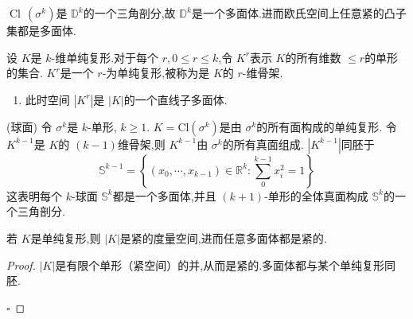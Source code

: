 \documentclass[../../几何与拓扑.tex]{subfiles}
\begin{document}
\begin{proposition}
    \(  \operatorname{Cl}\,\left(  \sigma ^{k} \right)   \)是 \(  \mathbb{D}^{k}  \)的一个三角剖分,故 \(  \mathbb{D}^{k}  \)是一个多面体.进而欧氏空间上任意紧的凸子集都是多面体.   
\end{proposition}


\begin{definition}
    设 \(  K  \)是 \(  k  \)-维单纯复形.对于每个 \(  r,  0\le r\le k  \),令 \(  K^{r}  \)表示 \(  K  \)的所有维数 \(  \le r  \)的单形的集合.       \(  K^{r}  \)是一个 \(  r  \)-为单纯复形,被称为是 \(  K  \)的 \(  r  \)-维骨架.
    
\end{definition}
\begin{remark}
    \begin{enumerate}
        \item 此时空间 \(  \left| K^{r} \right|   \)是 \(  \left| K \right|   \)的一个直线子多面体.  
    \end{enumerate}
    
\end{remark}



\begin{example}{(球面)}
    令 \(   \sigma ^{k}  \)是 \(  k  \)-单形, \(  k\ge 1  \). \(  K =  \mathrm{Cl}\left(  \sigma ^{k} \right)   \)是由 \(   \sigma ^{k}  \)的所有面构成的单纯复形.
    令 \(  K^{k-1}  \)是 \(  K  \)的 \(  \left( k-1 \right)   \)维骨架,则 \(  K^{k-1}  \)由 \(   \sigma ^{k}  \)的所有真面组成. \(  \left| K^{k-1} \right|   \)同胚于 \[
    \mathbb{S}^{k-1} =  \left\{ \left(  x_0,\cdots,x_{k-1}  \right) \in \mathbb{R} ^{k}: \sum _{0}^{k-1}x_{i}^{2}= 1  \right\}
    \]这表明每个 \(  k  \)-球面 \(  \mathbb{S}^{k}  \)都是一个多面体,并且 \(  \left( k+ 1 \right)   \)-单形的全体真面构成 \(  \mathbb{S}^{k}  \)的一个三角剖分.               
    
\end{example}

\hspace*{\fill} 

\begin{proposition}
    若 \(  K  \)是单纯复形,则 \(  \left| K \right|   \)是紧的度量空间,进而任意多面体都是紧的.  
\end{proposition}
\begin{proof}

    \(  \left| K \right|   \)是有限个单形（紧空间）的并,从而是紧的.多面体都与某个单纯复形同胚. 

    \hfill $\square$
\end{proof}
\end{document}
